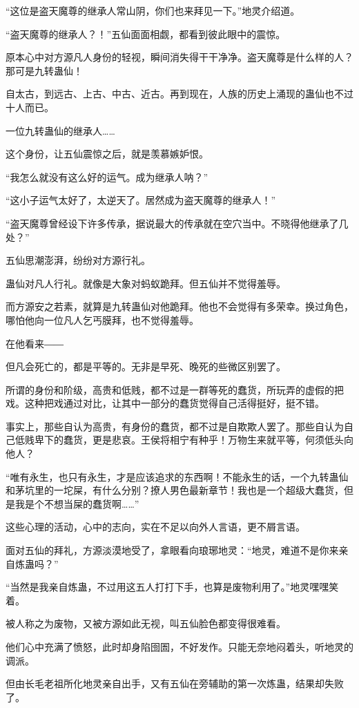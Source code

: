\begin{this_body}
“这位是盗天魔尊的继承人常山阴，你们也来拜见一下。”地灵介绍道。

“盗天魔尊的继承人？！”五仙面面相觑，都看到彼此眼中的震惊。

原本心中对方源凡人身份的轻视，瞬间消失得干干净净。盗天魔尊是什么样的人？那可是九转蛊仙！

自太古，到远古、上古、中古、近古。再到现在，人族的历史上涌现的蛊仙也不过十人而已。

一位九转蛊仙的继承人……

这个身份，让五仙震惊之后，就是羡慕嫉妒恨。

“我怎么就没有这么好的运气。成为继承人呐？”

“这小子运气太好了，太逆天了。居然成为盗天魔尊的继承人！”

“盗天魔尊曾经设下许多传承，据说最大的传承就在空穴当中。不晓得他继承了几处？”

五仙思潮澎湃，纷纷对方源行礼。

蛊仙对凡人行礼。就像是大象对蚂蚁跪拜。但五仙并不觉得羞辱。

而方源安之若素，就算是九转蛊仙对他跪拜。他也不会觉得有多荣幸。换过角色，哪怕他向一位凡人乞丐膜拜，也不觉得羞辱。

在他看来――

但凡会死亡的，都是平等的。无非是早死、晚死的些微区别罢了。

所谓的身份和阶级，高贵和低贱，都不过是一群等死的蠢货，所玩弄的虚假的把戏。这种把戏通过对比，让其中一部分的蠢货觉得自己活得挺好，挺不错。

事实上，那些自认为高贵，有身份的蠢货，都不过是自欺欺人罢了。那些自认为自己低贱卑下的蠢货，更是悲哀。王侯将相宁有种乎！万物生来就平等，何须低头向他人？

“唯有永生，也只有永生，才是应该追求的东西啊！不能永生的话，一个九转蛊仙和茅坑里的一坨屎，有什么分别？撩人男色最新章节！我也是一个超级大蠢货，但是我是个不想当屎的蠢货啊……”

这些心理的活动，心中的志向，实在不足以向外人言语，更不屑言语。

面对五仙的拜礼，方源淡漠地受了，拿眼看向琅琊地灵：“地灵，难道不是你来亲自炼蛊吗？”

“当然是我亲自炼蛊，不过用这五人打打下手，也算是废物利用了。”地灵嘿嘿笑着。

被人称之为废物，又被方源如此无视，叫五仙脸色都变得很难看。

他们心中充满了愤怒，此时却身陷囹圄，不好发作。只能无奈地闷着头，听地灵的调派。

但由长毛老祖所化地灵亲自出手，又有五仙在旁辅助的第一次炼蛊，结果却失败了。


\end{this_body}

